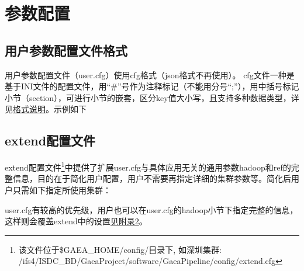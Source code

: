 \documentclass[UTF8,10pt,a4paper]{ctexart}
\begin{document}
\section{参数配置}
\subsection{用户参数配置文件格式}
用户参数配置文件（user.cfg）使用cfg格式（json格式不再使用）。
cfg文件一种是基于INI文件的配置文件，用``\#''号作为注释标记（不能用分号``;''），用中括号标记小节（section），可进行小节的嵌套，区分key值大小写，且支持多种数据类型，详见{\kaishu \href{http://configobj.readthedocs.org/en/latest/configobj.html#the-config-file-format}{格式说明}}。示例如下


\subsection{extend配置文件}
extend配置文件\footnote{该文件位于\$GAEA\_HOME/config/目录下, 如深圳集群: /ifs4/ISDC\_BD/GaeaProject/software/GaeaPipeline/config/extend.cfg}中提供了扩展user.cfg与具体应用无关的通用参数hadoop和ref的完整信息，目的在于简化用户配置，用户不需要再指定详细的集群参数等。简化后用户只需如下指定所使用集群：


user.cfg有较高的优先级，用户也可以在user.cfg的hadoop小节下指定完整的信息，这样则会覆盖extend中的设置{\kaishu \hyperref[C]{{\footnotesize 见附录2}}}。

\end{document}
